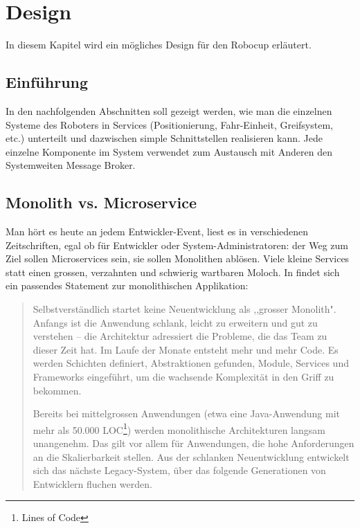 \chapter{Design}
\label{chap:software-design}
In diesem Kapitel wird ein mögliches Design für den Robocup erläutert.
\section{Einführung}
In den nachfolgenden Abschnitten soll gezeigt werden, wie man die einzelnen Systeme des Roboters in Services (Positionierung, Fahr-Einheit, Greifsystem, etc.) unterteilt und dazwischen simple Schnittstellen realisieren kann.
Jede einzelne Komponente im System verwendet zum Austausch mit Anderen den Systemweiten Message Broker.

\section{Monolith vs. Microservice}
Man hört es heute an jedem Entwickler-Event, liest es in verschiedenen Zeitschriften, egal ob für Entwickler oder System-Administratoren: der Weg zum Ziel sollen Microservices sein, sie sollen Monolithen ablösen. Viele kleine Services statt einen grossen, verzahnten und schwierig wartbaren Moloch.
In \cite{informatik-aktuell-microservices} findet sich ein passendes Statement zur monolithischen Applikation:
\begin{quote}
	Selbstverständlich startet keine Neuentwicklung als ,,grosser Monolith". Anfangs ist die Anwendung schlank, leicht zu erweitern und gut zu verstehen – die Architektur adressiert die Probleme, die das Team zu dieser Zeit hat. Im Laufe der Monate entsteht mehr und mehr Code. Es werden Schichten definiert, Abstraktionen gefunden, Module, Services und Frameworks eingeführt, um die wachsende Komplexität in den Griff zu bekommen.
	
	Bereits bei mittelgrossen Anwendungen (etwa eine Java-Anwendung mit mehr als 50.000 LOC\footnote{Lines of Code}) werden monolithische Architekturen langsam unangenehm. Das gilt vor allem für Anwendungen, die hohe Anforderungen an die Skalierbarkeit stellen. Aus der schlanken Neuentwicklung entwickelt sich das nächste Legacy-System, über das folgende Generationen von Entwicklern fluchen werden.
\end{quote}
